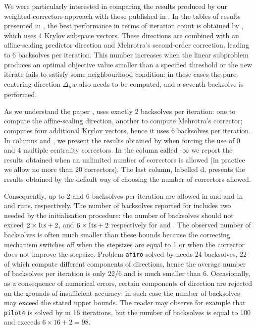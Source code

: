 We were particularly interested in comparing the results produced by our 
weighted correctors approach with those published in \cite{MehrotraLi}. 
%
%
In the tables of results presented in \cite{MehrotraLi}, the best 
performance in terms of iteration count is obtained by , which 
uses 4 Krylov subspace vectors. These directions are combined with 
an affine-scaling predictor direction and Mehrotra's second-order 
correction, leading to 6 backsolves per iteration. 
This number increases when the linear subproblem produces an optimal 
objective value smaller than a specified threshold or the new iterate 
fails to satisfy some neighbourhood condition: in these cases 
the pure centering direction $\Delta_\mu w$ also needs to be computed,
and a seventh backsolve is performed.

As we understand the paper \cite{MehrotraLi},  uses exactly 
2 backsolves per iteration: one to compute the affine-scaling direction,
another to compute Mehrotra's corrector;  computes
four additional Krylov vectors, hence it uses
6 backsolves per iteration.
In columns  and , we present 
the results obtained by \HOPDM when forcing the use of 0 and 4 
multiple centrality correctors. 
In the column called \HO-$\infty$ we report the results 
obtained when an unlimited number of correctors is allowed
(in practice we allow no more than 20 correctors).
The last column, labelled d\HO, presents the results obtained 
by the default way of choosing the number of correctors allowed.

Consequently, up to 2 and 6 backsolves per iteration are allowed
in  and  and in  and  runs, respectively.
The number of backsolves reported for \HOPDM includes two needed by 
the initialisation procedure: the number of backsolves 
should not exceed $2 \times {\rm {Its}} + 2$, 
and $6 \times {\rm {Its}} + 2$ respectively
for  and .
The observed number of backsolves is often much smaller
than these bounds because the correcting mechanism switches off 
when the stepsizes are equal to 1 or when the corrector does not 
improve the stepsize. Problem {\tt afiro} solved by  needs 24 
backsolves, 22 of which compute different components of directions, 
hence the average number of backsolves per iteration is only 22/6 
and is much smaller than 6. Occasionally,
as a consequence of numerical errors, certain components 
of direction are rejected on the grounds of insufficient accuracy:
in such case the number of backsolves may exceed the stated upper bounds.
The reader may observe for example that {\tt pilot4} is solved by 
in 16 iterations, but the number of backsolves is equal to 100 and 
exceeds $6 \times 16 + 2 = 98$.

